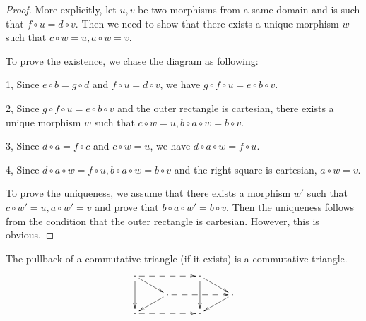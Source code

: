 \begin{proof}
    More explicitly, let $u,v$ be two morphisms from a same domain and is such that $f\circ u=d\circ v$. Then we need to show that there exists a unique morphism $w$ such that $c\circ w=u, a\circ w=v$.

    To prove the existence, we chase the diagram as following:

    1, Since $e\circ b=g\circ d$ and $f\circ u=d\circ v$, we have $g\circ f\circ u=e\circ b\circ v$.

    2, Since $g\circ f\circ u=e\circ b\circ v$ and the outer rectangle is cartesian, there exists a unique morphism $w$ such that $c\circ w=u, b\circ a\circ w=b\circ v$.

    3, Since $d\circ a=f\circ c$ and $c\circ w=u$, we have $d\circ a\circ w=f\circ u$.

    4, Since $d\circ a\circ w=f\circ u, b\circ a\circ w=b\circ v$ and the right square is cartesian, $a\circ w=v$.

    To prove the uniqueness, we assume that there exists a morphism $w'$ such that $c\circ w'=u, a\circ w'=v$ and prove that $b\circ a\circ w'=b\circ v$. Then the uniqueness follows from the condition that the outer rectangle is cartesian. However, this is obvious.
  \end{proof}
  \begin{cor}
    The pullback of a commutative triangle (if it exists) is a commutative triangle.
    \begin{displaymath}
      \xymatrix@R=0.3cm{
         \cdot\ar@{-->}[rr]\ar[dd]\ar[dr]&&\cdot\ar[dd]\ar[dr]&\\
         &\cdot\ar@{-->}[rr]\ar[dl]&&\cdot\ar[dl]\\
         \cdot\ar@{-->}[rr]&&\cdot
      }
    \end{displaymath}
  \end{cor}

